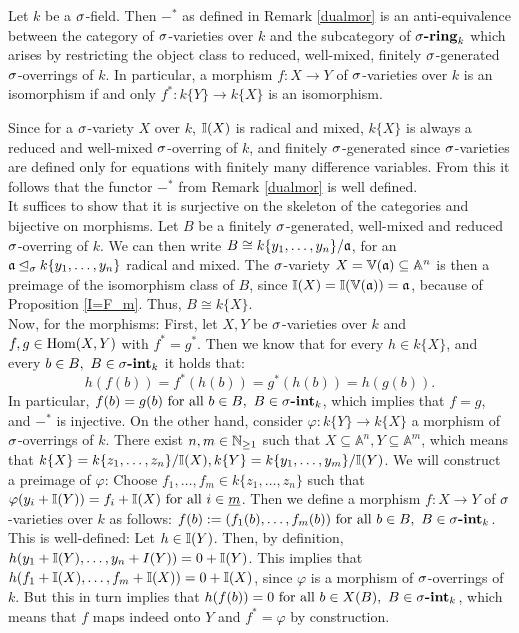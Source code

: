 \begin{prop}\label{dualisequiv}
Let $k$ be a $\sigma$-field. Then $-^*$ as defined in Remark \ref{dualmor} is an anti-equivalence between the category of $\sigma$-varieties over $k$ and the subcategory of $\sigma\text{{\normalfont\textbf{-ring}}}_k$ which arises by restricting the object class to reduced, well-mixed, finitely $\sigma$-generated $\sigma$-overrings of $k$. 
In particular, a morphism $f: X \rightarrow Y$ of $\sigma$-varieties over $k$ is an isomorphism if and only $f^*: k\{Y\} \rightarrow k\{X\}$ is an isomorphism.
\begin{bew}
Since for a $\sigma$-variety $X$ over $k$, $\mathbb{I}(X)$ is radical and mixed, $k\{X\}$ is always a reduced and well-mixed $\sigma$-overring of $k$, 
and finitely $\sigma$-generated since $\sigma$-varieties are defined only for equations with finitely many difference variables. From this it follows that the functor $-^*$ from Remark \ref{dualmor} is well defined. \\
It suffices to show that it is surjective on the skeleton of the categories and bijective on morphisms. 
Let $B$ be a finitely $\sigma$-generated, well-mixed and reduced $\sigma$-overring of $k$. We can then write $B \cong k\{y_1,\ldots,y_n\}/\mathfrak{a}$, for an $\mathfrak{a} \unlhd_{\sigma} k\{y_1,\ldots,y_n\}$ radical and mixed. The $\sigma$-variety $X = \mathbb{V}(\mathfrak{a}) \subseteq \mathbb{A}^n$
is then a preimage of the isomorphism class of $B$, since $\mathbb{I}(X) = \mathbb{I}(\mathbb{V}(\mathfrak{a})) = \mathfrak{a}$, because of Proposition \ref{I=F_m}. Thus, $B \cong k\{X\}$. \\
\indent Now, for the morphisms: First, let $X,Y$ be $\sigma$-varieties over $k$ and $f,g \in \text{Hom}(X,Y)$ with $f^* = g^*$. Then we know that for every $h \in k\{X\}$, and every $b \in B, ~ B \in \sigma\text{{\normalfont\textbf{-int}}}_k$ it holds that:
\[ h(f(b)) = f^*(h(b)) = g^*(h(b)) = h(g(b)). \]
In particular, $f(b) = g(b) \text{ for all } b \in B, ~ B \in \sigma\text{{\normalfont\textbf{-int}}}_k$, which implies that $f = g$, and $-^*$ is injective. 
On the other hand, consider $\varphi: k\{Y\} \rightarrow k\{X\}$ a morphism of $\sigma$-overrings of $k$. There exist $n,m \in \mathbb{N}_{\geq1}$ such that $X \subseteq \mathbb{A}^n, Y \subseteq \mathbb{A}^m$,
 which means that $k\{X\} = k\{z_1,\ldots,z_n\}/\mathbb{I}(X), k\{Y\} = k\{y_1,\ldots,y_m\}/\mathbb{I}(Y)$. We will construct a preimage of $\varphi$: Choose $f_1,\ldots,f_m \in k\{z_1,\ldots,z_n\}$ such that $\varphi(y_i + \mathbb{I}(Y)) = f_i + \mathbb{I}(X) \text{ for all } i \in \underline{m}$.
Then we define a morphism $f: X \rightarrow Y$ of $\sigma$-varieties over $k$ as follows: $f(b) := (f_1(b),\ldots,f_m(b)) \text{ for all } b \in B, ~ B \in \sigma\text{{\normalfont\textbf{-int}}}_k$. This is well-defined: Let $h \in \mathbb{I}(Y)$. Then, by definition, $h(y_1 + \mathbb{I}(Y),\ldots,y_n + I(Y)) = 0 + \mathbb{I}(Y)$.
This implies that $h(f_1 + \mathbb{I}(X),\ldots,f_m + \mathbb{I}(X)) = 0 + \mathbb{I}(X)$, since $\varphi$ is a morphism of $\sigma$-overrings of $k$. But this in turn implies that $h(f(b)) = 0 \text{ for all } b \in X(B), ~ B \in \sigma\text{{\normalfont\textbf{-int}}}_k$, which means that $f$ maps indeed onto $Y$ and $f^* = \varphi$ by construction.
\end{bew}
\end{prop}

